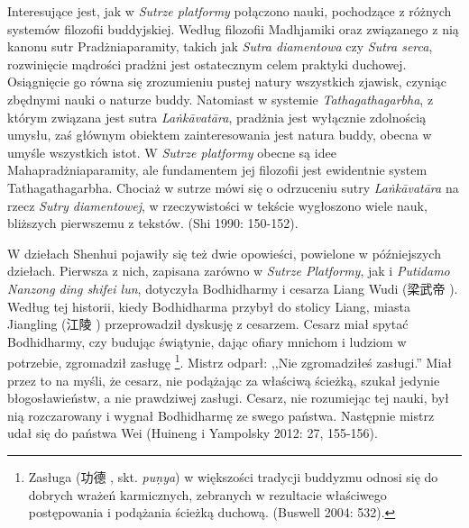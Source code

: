 Interesujące jest, jak w \textit{Sutrze platformy} połączono nauki, pochodzące z różnych systemów filozofii buddyjskiej.
Według filozofii Madhjamiki oraz związanego z nią kanonu sutr Pradżniaparamity, takich jak \textit{Sutra diamentowa} czy \textit{Sutra serca}, rozwinięcie mądrości pradżni jest ostatecznym celem praktyki duchowej.
Osiągnięcie go równa się zrozumieniu pustej natury wszystkich zjawisk, czyniąc zbędnymi nauki o naturze buddy.
Natomiast w systemie \textit{Tathagathagarbha}, z którym związana jest sutra \textit{La\.nkā\-vatāra}, pradżnia jest wyłącznie zdolnością umysłu, zaś głównym obiektem zainteresowania jest natura buddy, obecna w umyśle wszystkich istot.
W \textit{Sutrze platformy} obecne są idee Mahapradżniaparamity, ale fundamentem jej filozofii jest ewidentnie system Tathagathagarbha.
Chociaż w sutrze mówi się o odrzuceniu sutry \textit{La\.nkā\-vatāra} na rzecz \textit{Sutry diamentowej}, w rzeczywistości w tekście wygłoszono wiele nauk, bliższych pierwszemu z tekstów.
(Shi 1990: 150-152).

W dziełach Shenhui pojawiły się też dwie opowieści, powielone w późniejszych dziełach. Pierwsza z nich, zapisana zarówno w \textit{Sutrze Platformy}, jak i \textit{Putidamo Nanzong ding shifei lun}, dotyczyła Bodhidharmy i cesarza Liang Wudi (梁武帝 ).
Według tej historii, kiedy Bodhidharma przybył do stolicy Liang, miasta Jiangling (江陵 ) przeprowadził dyskusję z cesarzem. Cesarz miał spytać Bodhidharmy, czy budując świątynie, dając ofiary mnichom i ludziom w potrzebie, zgromadził zasługę%
\footnote{Zasługa (功德 , skt. \textit{pu\d{n}ya}) w większości tradycji buddyzmu odnosi się do dobrych wrażeń karmicznych, zebranych w rezultacie właściwego postępowania i podążania ścieżką duchową. (Buswell 2004: 532).}.
Mistrz odparł: ,,Nie zgromadziłeś zasługi.'' Miał przez to na myśli, że cesarz, nie podążając za właściwą ścieżką, szukał jedynie błogosławieństw, a nie prawdziwej zasługi. Cesarz, nie rozumiejąc tej nauki, był nią rozczarowany i wygnał Bodhidharmę ze swego państwa. Następnie mistrz udał się do państwa Wei\label{LiangWuDi} (Huineng i Yampolsky 2012: 27, 155-156).


